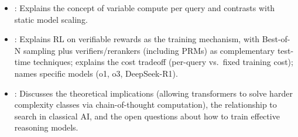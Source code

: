 \begin{interviewq}

\goodgreat
\begin{itemize}
\item {}: Explains the concept of variable compute per query
  and contrasts with static model scaling.
\item {}: Explains RL on verifiable rewards as the training
  mechanism, with Best-of-N sampling plus verifiers/rerankers (including
  PRMs) as complementary test-time techniques; explains the cost tradeoff
  (per-query vs.\ fixed training cost); names specific models (o1, o3,
  DeepSeek-R1).
\item {}: Discusses the theoretical implications (allowing
  transformers to solve harder complexity classes via chain-of-thought
  computation), the relationship to search in classical AI, and the
  open questions about how to train effective reasoning models.
\end{itemize}

\end{interviewq}

